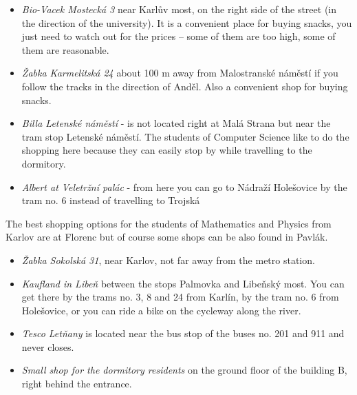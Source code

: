 \begin{itemize}
\item \textit{Bio-Vacek Mostecká 3} near Karlův most, on the right side of the
street (in the direction of the university). It is a convenient place for buying
snacks, you just need to watch out for the prices -- some of them are too high,
some of them are reasonable.
\item \textit{Žabka Karmelitská 24} about 100 m away from Malostranské náměstí
if you follow the tracks in the direction of Anděl. Also a convenient shop for
buying snacks.
\item \textit{Billa Letenské náměstí} - is not located right at Malá Strana but
near the tram stop Letenské náměstí. The students of Computer Science like to do
the shopping here because they can easily stop by while travelling to the
dormitory.
\item \textit{Albert at Veletržní palác} - from here you can go to Nádraží
Holešovice by the tram no. 6 instead of travelling to Trojská
\end{itemize}

The best shopping options for the students of Mathematics and Physics from
Karlov are at Florenc but of course some shops can be also found in Pavlák.
\begin{itemize}
\item \textit{Žabka Sokolská 31}, near Karlov, not far away from the metro
station.
\end{itemize}

\begin{itemize}
\item \textit{Kaufland in Libeň} between the stops Palmovka and Libeňský most.
You can get there by the trams no. 3, 8 and 24 from Karlín, by the tram no. 6
from Holešovice, or you can ride a bike on the cycleway along the river.
\item \textit{Tesco Letňany} is located near the bus stop of the buses no. 201
and 911 and never closes.
\item \textit{Small shop for the dormitory residents} on the ground floor of the
building B, right behind the entrance.
\end{itemize}

